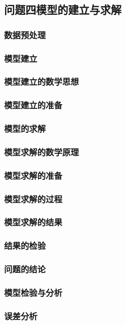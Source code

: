 \documentclass{ctexart}
\begin{document}
    \subsection{问题四模型的建立与求解}
\subsubsection{数据预处理}
\subsubsection{模型建立}
\subsubsection{模型建立的数学思想}
\subsubsection{模型建立的准备}
\subsubsection{模型的求解}
\subsubsection{模型求解的数学原理}
\subsubsection{模型求解的准备}
\subsubsection{模型求解的过程}
\subsubsection{模型求解的结果}
\subsubsection{结果的检验}
\subsubsection{问题的结论}
\subsubsection{模型检验与分析}
\subsubsection{误差分析}
\end{document}
